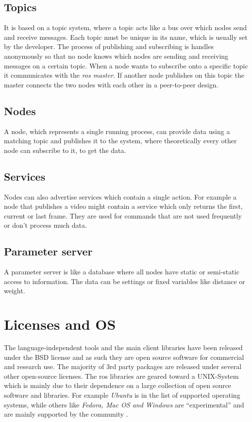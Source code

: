 \subsection{Topics}
It is based on a topic system, where a topic acts like a bus over which nodes send and receive messages. Each topic must be unique in its name, which is usually set by the developer. The process of publishing and subscribing is handles anonymously so that no node knows which nodes are sending and receiving messages on a certain topic. When a node wants to subscribe onto a specific topic it communicates with the \textit{\gls{ros} master}. If another node publishes on this topic the master connects the two nodes with each other in a peer-to-peer design.

\subsection{Nodes}
A node, which represents a single running process, can provide data using a matching topic and publishes it to the system, where theoretically every other node can subscribe to it, to get the data. 

\subsection{Services} \label{ref:rosservice}
Nodes can also advertise services which contain a single action. For example a node that publishes a video might contain a service which only returns the first, current or last frame. They are used for commands that are not used frequently or don't process much data.

\subsection{Parameter server}
A parameter server is like a database where all nodes have static or semi-static access to information. The data can be settings or fixed variables like distance or weight.

\section{Licenses and OS}
The language-independent tools and the main client libraries have been released under the BSD license and as such they are open source software for commercial and research use. The majority of 3rd party packages are released under several other open-source licenses.\newline
The \gls{ros} libraries are geared toward a UNIX-System which is mainly due to their dependence on a large collection of open source software and libraries.
For example \textit{Ubuntu} is in the list of supported operating systems, while others like \textit{Fedora, Mac OS and Windows} are \enquote{experimental} and are mainly supported by the community \cite{isrosforme}.

